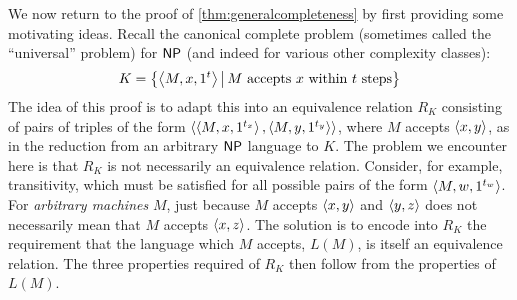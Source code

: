 We now return to the proof of \autoref{thm:generalcompleteness} by first providing some motivating ideas.
Recall the canonical complete problem (sometimes called the ``universal'' problem) for ${\mathsf{NP}}$ (and indeed for various other complexity classes):
\begin{displaymath}
  K = \left\{\left\langle M,x,1^t\right\rangle \, \middle| \, M \text{ accepts } x \text{ within } t \text{ steps}\right\}
\end{displaymath}
The idea of this proof is to adapt this into an equivalence relation $R_K$ consisting of pairs of triples of the form $\langle\left\langle M,x,1^{t_x}\right\rangle,\left\langle M,y,1^{t_y}\right\rangle\rangle$, where $M$ accepts $\langle x,y\rangle$, as in the reduction from an arbitrary ${\mathsf{NP}}$ language to $K$.
The problem we encounter here is that $R_K$ is not necessarily an equivalence relation.
Consider, for example, transitivity, which must be satisfied for all possible pairs of the form $\left\langle M,w,1^{t_w}\right\rangle$.
For \emph{arbitrary machines} $M$, just because $M$ accepts $\langle x,y\rangle$ and $\langle y,z\rangle$ does not necessarily mean that $M$ accepts $\langle x,z\rangle$.
The solution is to encode into $R_K$ the requirement that the language which $M$ accepts, $L(M)$, is itself an equivalence relation.
The three properties required of $R_K$ then follow from the properties of $L(M)$.
%
%
